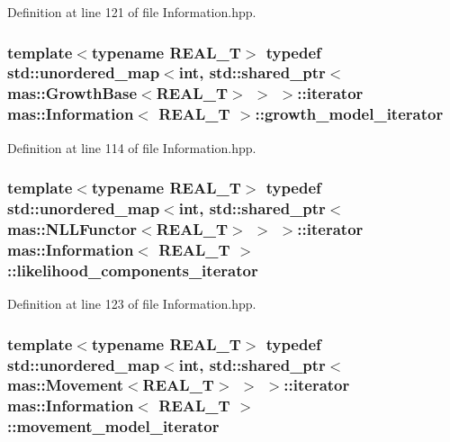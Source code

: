 Definition at line 121 of file Information.\-hpp.

\hypertarget{classmas_1_1_information_aa19e91aec674c826cbb84ebdc1d17be7}{
\subsubsection[{growth\-\_\-model\-\_\-iterator}]{\setlength{\rightskip}{0pt plus 5cm}template$<$typename R\-E\-A\-L\-\_\-\-T$>$ typedef std\-::unordered\-\_\-map$<$int, std\-::shared\-\_\-ptr$<${\bf mas\-::\-Growth\-Base}$<$R\-E\-A\-L\-\_\-\-T$>$ $>$ $>$\-::iterator {\bf mas\-::\-Information}$<$ R\-E\-A\-L\-\_\-\-T $>$\-::{\bf growth\-\_\-model\-\_\-iterator}}}\label{classmas_1_1_information_aa19e91aec674c826cbb84ebdc1d17be7}


Definition at line 114 of file Information.\-hpp.

\hypertarget{classmas_1_1_information_a566708cde6d1c6f4846f41566c6ee846}{
\subsubsection[{likelihood\-\_\-components\-\_\-iterator}]{\setlength{\rightskip}{0pt plus 5cm}template$<$typename R\-E\-A\-L\-\_\-\-T$>$ typedef std\-::unordered\-\_\-map$<$int, std\-::shared\-\_\-ptr$<${\bf mas\-::\-N\-L\-L\-Functor}$<$R\-E\-A\-L\-\_\-\-T$>$ $>$ $>$\-::iterator {\bf mas\-::\-Information}$<$ R\-E\-A\-L\-\_\-\-T $>$\-::{\bf likelihood\-\_\-components\-\_\-iterator}}}\label{classmas_1_1_information_a566708cde6d1c6f4846f41566c6ee846}


Definition at line 123 of file Information.\-hpp.

\hypertarget{classmas_1_1_information_aa69e662c74a82f02c72a94684c289490}{
\subsubsection[{movement\-\_\-model\-\_\-iterator}]{\setlength{\rightskip}{0pt plus 5cm}template$<$typename R\-E\-A\-L\-\_\-\-T$>$ typedef std\-::unordered\-\_\-map$<$int, std\-::shared\-\_\-ptr$<${\bf mas\-::\-Movement}$<$R\-E\-A\-L\-\_\-\-T$>$ $>$ $>$\-::iterator {\bf mas\-::\-Information}$<$ R\-E\-A\-L\-\_\-\-T $>$\-::{\bf movement\-\_\-model\-\_\-iterator}}}\label{classmas_1_1_information_aa69e662c74a82f02c72a94684c289490}


